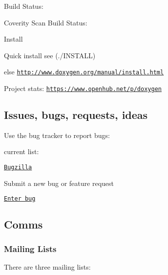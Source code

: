\begin{DoxyItemize}
\item Build Status\+: \href{https://travis-ci.org/doxygen/doxygen}{\tt }
\item Coverity Scan Build Status\+: \href{https://scan.coverity.com/projects/2860}{\tt }
\item Install
\begin{DoxyItemize}
\item Quick install see (./\+I\+N\+S\+T\+A\+L\+L)
\item else \href{http://www.doxygen.org/manual/install.html}{\tt http\+://www.\+doxygen.\+org/manual/install.\+html}
\end{DoxyItemize}
\item Project stats\+: \href{https://www.openhub.net/p/doxygen}{\tt https\+://www.\+openhub.\+net/p/doxygen}
\end{DoxyItemize}

\subsection*{Issues, bugs, requests, ideas }

Use the bug tracker to report bugs\+:
\begin{DoxyItemize}
\item current list\+:
\begin{DoxyItemize}
\item \href{https://bugzilla.gnome.org/buglist.cgi?product=doxygen&bug_status=UNCONFIRMED&bug_status=NEW&bug_status=ASSIGNED&bug_status=REOPENED}{\tt Bugzilla}
\end{DoxyItemize}
\item Submit a new bug or feature request
\begin{DoxyItemize}
\item \href{https://bugzilla.gnome.org/enter_bug.cgi?product=doxygen}{\tt Enter bug}
\end{DoxyItemize}
\end{DoxyItemize}

\subsection*{Comms }

\subsubsection*{Mailing Lists}

There are three mailing lists\+:


